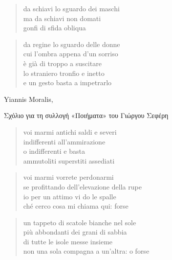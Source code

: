 \clearpage


	\begin{verse}
		da schiavi lo sguardo dei maschi\\
		ma da schiavi non domati\\
		gonfi di sfida obliqua
	\end{verse}

	\begin{verse}
		da regine lo sguardo delle donne\\
		cui l'ombra appena d'un sorriso\\
		è già di troppo a suscitare\\
		lo straniero tronfio e inetto\\
		e un gesto basta a impetrarlo
	\end{verse}

\clearpage


\begin{artItem}
	Yiannis Moralis, \begin{otherlanguage}{greek}%
		Σχόλιο για τη συλλογή «Ποιήματα» του Γιώργου Σεφέρη%
	\end{otherlanguage}
\end{artItem}

	\begin{verse}
		voi marmi antichi saldi e severi\\
		indifferenti all'ammirazione\\
		o indifferenti e basta\\
		ammutoliti superstiti assediati
	\end{verse}

	\begin{verse}
		voi marmi vorrete perdonarmi\\
		se profittando dell'elevazione della rupe\\
		io per un attimo vi do le spalle\\
		ché cerco cosa mi chiama qui: forse
	\end{verse}

	\begin{verse}
		un tappeto di scatole bianche nel sole\\
		più abbondanti dei grani di sabbia\\
		di tutte le isole messe insieme\\
		non una sola compagna a un'altra: o forse
	\end{verse}

